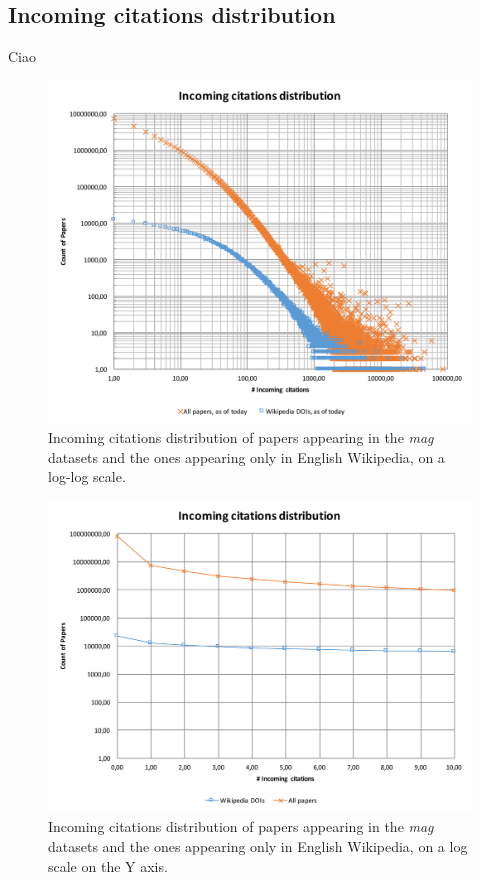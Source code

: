 \subsection{Incoming citations distribution}
Ciao
\begin{figure}[ht]
    \centering
    \includegraphics[keepaspectratio=true, width=\textwidth]{assets/incoming_cits}
    \caption{Incoming citations distribution of papers appearing in the \emph{mag} datasets and the ones appearing only in English Wikipedia, on a log-log scale.}
    \label{fig:incoming_citations_loglog}
\end{figure}

\begin{figure}[ht]
    \centering
    \includegraphics[keepaspectratio=true, width=\textwidth]{assets/incoming_cits_log}
    \caption{Incoming citations distribution of papers appearing in the \emph{mag} datasets and the ones appearing only in English Wikipedia, on a log scale on the Y axis.}
    \label{fig:incoming_citations_log}
\end{figure}

